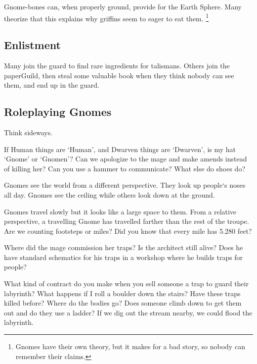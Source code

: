 \begin{multicols}{2}
\subsubsection{}


Gnome-bones can, when properly ground, provide  for the Earth Sphere.
Many theorize that this explains why griffins seem to eager to eat them.%
\footnote{Gnomes have their own theory, but it makes for a bad story, so nobody can remember their claims.}

\subsection{Enlistment}

Many join the \gls{guard} to find rare \glspl{ingredient} for \glspl{talisman}.
Others join the \gls{paperGuild}, then steal some valuable book when they think nobody can see them, and end up in the \gls{guard}.

\subsection{Roleplaying Gnomes}

{\raggedleft Think sideways.\par}
\noindent
If Human things are `Human', and Dwarven things are `Dwarven', is my hat `Gnome' or `Gnomen'?
Can we apologize to the mage and make amends instead of killing her?
Can you use a hammer to communicate?
What else do shoes do?

Gnomes see the world from a different perspective.
They look up people`s noses all day.
Gnomes see the ceiling while others look down at the ground.

Gnomes travel slowly but it looks like a large space to them.
From a relative perspective, a travelling Gnome has travelled farther than the rest of the troupe.
Are we counting footsteps or miles?
Did you know that every mile has 5.280 feet?

Where did the mage commission her traps?
Is the architect still alive?
Does he have standard schematics for his traps in a workshop where he builds traps for people?

What kind of contract do you make when you sell someone a trap to guard their labyrinth?
What happens if I roll a boulder down the stairs?
Have these traps killed before?
Where do the bodies go?
Does someone climb down to get them out and do they use a ladder?
If we dig out the stream nearby, we could flood the labyrinth.

\end{multicols}

